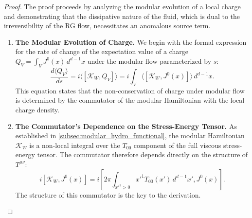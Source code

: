 \documentclass[11pt, letterpaper]{report}
\theoremstyle{plain} %
\theoremstyle{definition} %
\theoremstyle{remark} %
\newcommand{\ModularK}{\mathcal{K}}
\begin{document}
\begin{proof}
The proof proceeds by analyzing the modular evolution of a local charge and demonstrating that the dissipative nature of the fluid, which is dual to the irreversibility of the RG flow, necessitates an anomalous source term.

\begin{enumerate}
    \item \textbf{The Modular Evolution of Charge.} We begin with the formal expression for the rate of change of the expectation value of a charge $Q_V = \int_V J^0(x) \, d^{d-1}x$ under the modular flow parameterized by $s$:
    \begin{equation}
        \frac{d\langle Q_V \rangle}{ds} = i \langle [\ModularK_W, Q_V] \rangle = i \int_V \langle [\ModularK_W, J^0(x)] \rangle \, d^{d-1}x.
        \label{eq:charge_evolution_modular}
    \end{equation}
    This equation states that the non-conservation of charge under modular flow is determined by the commutator of the modular Hamiltonian with the local charge density.

    \item \textbf{The Commutator's Dependence on the Stress-Energy Tensor.} As established in \cref{subsec:modular_hydro_functional}, the modular Hamiltonian $\ModularK_W$ is a non-local integral over the $T_{00}$ component of the full viscous stress-energy tensor. The commutator therefore depends directly on the structure of $T^{\mu\nu}$:
    \begin{equation}
        i[\ModularK_W, J^0(x)] = i \left[ 2\pi \int_{x'^1>0} x'^1 T_{00}(x') \, d^{d-1}x', J^0(x) \right].
    \end{equation}
    The structure of this commutator is the key to the derivation.


\end{enumerate}
\end{proof}
\end{document}
